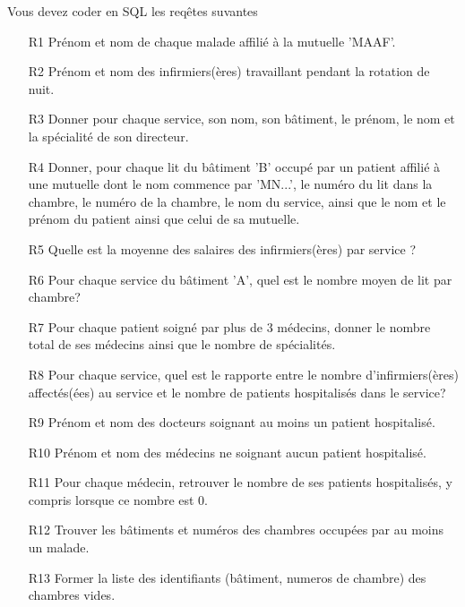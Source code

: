 Vous devez coder en SQL les reqêtes suvantes 
\begin{enumerate}
  \item[R1] Prénom et nom de chaque malade affilié à la mutuelle 'MAAF'.
  \item[R2] Prénom et nom des infirmiers(ères) travaillant pendant la rotation de nuit.
  \item[R3] Donner pour chaque service, son nom, son bâtiment, le prénom, le nom et la spécialité de son directeur.
  
  \item[R4] Donner, pour chaque lit du bâtiment 'B' occupé par un patient affilié à une mutuelle dont le nom commence par 'MN...', le numéro du lit dans la chambre, le numéro de la chambre, le nom du service, ainsi que le nom et le prénom du patient ainsi que celui de sa mutuelle.
  
  \item[R5] Quelle est la moyenne des salaires des infirmiers(ères) par service ?
  
  \item[R6] Pour chaque service du bâtiment 'A', quel est le nombre moyen de lit par chambre?
  
  \item[R7] Pour chaque patient soigné par plus de 3 médecins, donner le nombre total de ses médecins ainsi que le nombre de spécialités.
  
  \item[R8] Pour chaque service, quel est le rapporte entre le nombre d'infirmiers(ères) affectés(ées) au service et le nombre de patients hospitalisés dans le service?
  
  \item[R9] Prénom et nom des docteurs soignant au moins un patient hospitalisé.
  
  \item[R10] Prénom et nom des médecins ne soignant aucun patient hospitalisé.
  
  \item[R11] Pour chaque médecin, retrouver le nombre de ses patients hospitalisés, y compris lorsque ce nombre est 0.
  
  \item[R12] Trouver les bâtiments et numéros des chambres occupées par au moins un malade.
  
  \item[R13] Former la liste des identifiants (bâtiment, numeros de chambre) des chambres vides.
  

\end{enumerate}
